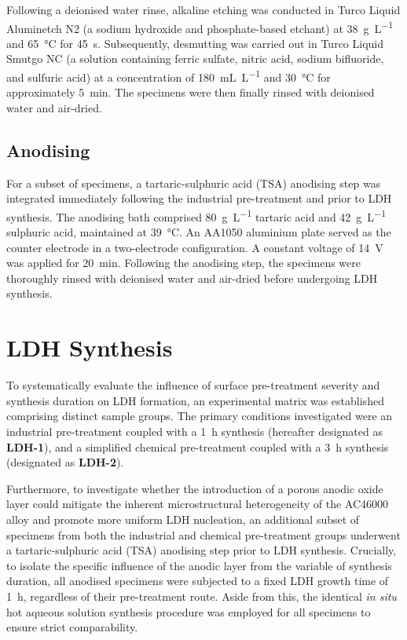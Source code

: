 \documentclass[11pt,twoside,a4paper,final]{report}
\begin{document}
Following a deionised water rinse, alkaline etching was conducted in Turco Liquid Aluminetch N2 (a sodium hydroxide and phosphate-based etchant) at \qty{38}{\gram\per\liter} and \qty{65}{\degreeCelsius} for \qty{45}{\second}. Subsequently, desmutting was carried out in Turco Liquid Smutgo NC (a solution containing ferric sulfate, nitric acid, sodium bifluoride, and sulfuric acid) at a concentration of \qty{180}{\milli\liter\per\liter} and \qty{30}{\degreeCelsius} for approximately \qty{5}{\minute}. The specimens were then finally rinsed with deionised water and air-dried.

\subsection{Anodising}
\label{subsec:anodising}

For a subset of specimens, a tartaric-sulphuric acid (TSA) anodising step was integrated immediately following the industrial pre-treatment and prior to LDH synthesis. The anodising bath comprised \qty{80}{\gram\per\liter} tartaric acid and \qty{42}{\gram\per\liter} sulphuric acid, maintained at \qty{39}{\degreeCelsius}. An AA1050 aluminium plate served as the counter electrode in a two-electrode configuration. A constant voltage of \qty{14}{\volt} was applied for \qty{20}{\minute}. Following the anodising step, the specimens were thoroughly rinsed with deionised water and air-dried before undergoing LDH synthesis.

\section{LDH Synthesis}
\label{sec:LDH_synthesis}

To systematically evaluate the influence of surface pre-treatment severity and synthesis duration on LDH formation, an experimental matrix was established comprising distinct sample groups. The primary conditions investigated were an industrial pre-treatment coupled with a \qty{1}{\hour} synthesis (hereafter designated as \textbf{LDH-1}), and a simplified chemical pre-treatment coupled with a \qty{3}{\hour} synthesis (designated as \textbf{LDH-2}). 

Furthermore, to investigate whether the introduction of a porous anodic oxide layer could mitigate the inherent microstructural heterogeneity of the AC46000 alloy and promote more uniform LDH nucleation, an additional subset of specimens from both the industrial and chemical pre-treatment groups underwent a tartaric-sulphuric acid (TSA) anodising step prior to LDH synthesis. Crucially, to isolate the specific influence of the anodic layer from the variable of synthesis duration, all anodised specimens were subjected to a fixed LDH growth time of \qty{1}{\hour}, regardless of their pre-treatment route. Aside from this, the identical \textit{in situ} hot aqueous solution synthesis procedure was employed for all specimens to ensure strict comparability.
\end{document}
